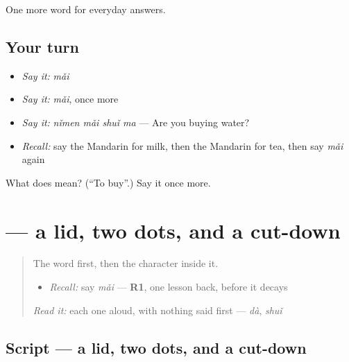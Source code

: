 \begin{grammarlens}[title={What you've built}]
One more word for everyday answers.
\end{grammarlens}

\subsection*{Your turn}
\begin{itemize}
\raggedright
  \item \emph{Say it:} \emph{mǎi}
  \item \emph{Say it:} \emph{mǎi}, once more
  \item \emph{Say it:} \emph{nǐmen mǎi shuǐ ma} — Are you buying water?
  \item \emph{Recall:} say the Mandarin for milk, then the Mandarin for tea, then say \emph{mǎi} again
\end{itemize}

\begin{tcolorbox}[breakable,colback=teal!4,colframe=teal!35!black,title={Before you move on}]
What does  mean? (\textquotedblleft{}To buy\textquotedblright{}.) Say it once more.
\end{tcolorbox}
\section[\texorpdfstring{\zh{买} (mǎi)}{买 (mǎi)}]{ — a lid, two dots, and a cut-down }

\label{lesson:ZH-W40-mai}



\begin{quote}
The word first, then the character inside it.

\begin{itemize}
\raggedright
  \item \emph{Recall:} say \emph{mǎi} — \textbf{R1}, one lesson back, before it decays
\end{itemize}

\begin{quote}
 
\end{quote}

\emph{Read it:} each one aloud, with nothing said first — \emph{dà}, \emph{shuǐ}
\end{quote}

\subsection*{Script — a lid, two dots, and a cut-down }

